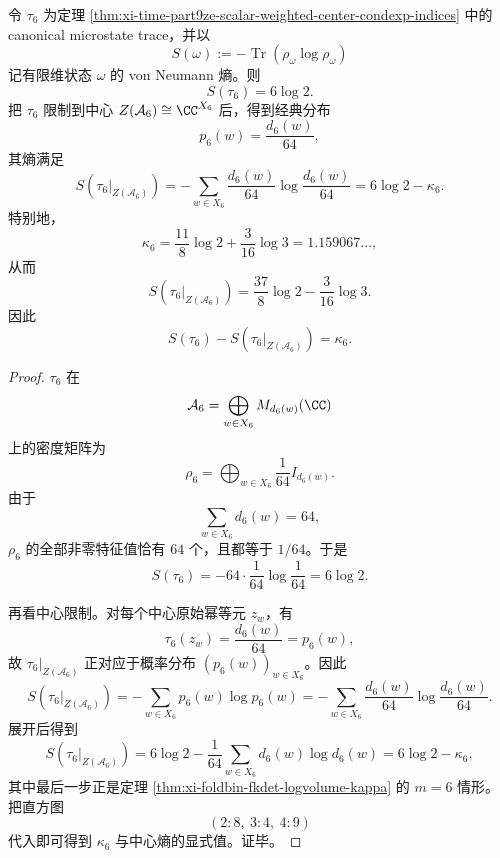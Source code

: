 \begin{theorem}\label{thm:xi-time-part9ze-kappa6-vn-entropy-loss}
令 \(\tau_6\) 为定理 \ref{thm:xi-time-part9ze-scalar-weighted-center-condexp-indices} 中的 canonical microstate trace，并以
\[
S(\omega):=-\operatorname{Tr}(\rho_\omega\log \rho_\omega)
\]
记有限维状态 \(\omega\) 的 von Neumann 熵。则
\[
S(\tau_6)=6\log 2.
\]
把 \(\tau_6\) 限制到中心 \(Z(\mathcal A_6)\cong \CC^{X_6}\) 后，得到经典分布
\[
p_6(w)=\frac{d_6(w)}{64},
\]
其熵满足
\[
S(\tau_6|_{Z(\mathcal A_6)})
=
-\sum_{w\in X_6}\frac{d_6(w)}{64}\log\frac{d_6(w)}{64}
=
6\log 2-\kappa_6.
\]
特别地，
\[
\kappa_6=\frac{11}{8}\log 2+\frac{3}{16}\log 3=1.159067\ldots,
\]
从而
\[
S(\tau_6|_{Z(\mathcal A_6)})
=
\frac{37}{8}\log 2-\frac{3}{16}\log 3.
\]
因此
\[
S(\tau_6)-S(\tau_6|_{Z(\mathcal A_6)})=\kappa_6.
\]
\end{theorem}
\begin{proof}
\(\tau_6\) 在
\[
\mathcal A_6=\bigoplus_{w\in X_6}M_{d_6(w)}(\CC)
\]
上的密度矩阵为
\[
\rho_6=\bigoplus_{w\in X_6}\frac{1}{64}I_{d_6(w)}.
\]
由于
\[
\sum_{w\in X_6}d_6(w)=64,
\]
\(\rho_6\) 的全部非零特征值恰有 \(64\) 个，且都等于 \(1/64\)。于是
\[
S(\tau_6)
=
-64\cdot \frac{1}{64}\log\frac{1}{64}
=
6\log 2.
\]

再看中心限制。对每个中心原始幂等元 \(z_w\)，有
\[
\tau_6(z_w)=\frac{d_6(w)}{64}=p_6(w),
\]
故 \(\tau_6|_{Z(\mathcal A_6)}\) 正对应于概率分布 \((p_6(w))_{w\in X_6}\)。因此
\[
S(\tau_6|_{Z(\mathcal A_6)})
=
-\sum_{w\in X_6}p_6(w)\log p_6(w)
=
-\sum_{w\in X_6}\frac{d_6(w)}{64}
\log\frac{d_6(w)}{64}.
\]
展开后得到
\[
S(\tau_6|_{Z(\mathcal A_6)})
=
6\log 2-\frac{1}{64}\sum_{w\in X_6}d_6(w)\log d_6(w)
=
6\log 2-\kappa_6,
\]
其中最后一步正是定理 \ref{thm:xi-foldbin-fkdet-logvolume-kappa} 的 \(m=6\) 情形。把直方图
\[
(2:8,\ 3:4,\ 4:9)
\]
代入即可得到 \(\kappa_6\) 与中心熵的显式值。证毕。
\end{proof}

\endinput

